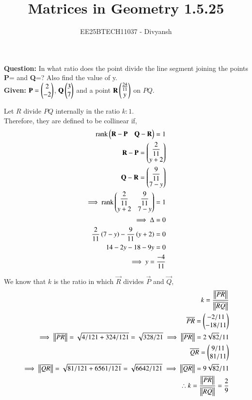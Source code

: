 \documentclass[journal,12pt,onecolumn]{IEEEtran}
\title{Matrices in Geometry 1.5.25}
\author{EE25BTECH11037 - Divyansh}
\theoremstyle{remark}
\begin{document}
\vspace{3cm}
\maketitle
{\let\newpage\relax\maketitle}
\textbf{Question: }
In what ratio does the point  divide the line segment joining the points \textbf{P}= and \textbf{Q}=? Also find the value of y.\\

\textbf{Given: } 
$\mathbf{P}=\begin{pmatrix}2\\-2\end{pmatrix}$, $\mathbf{Q}\begin{pmatrix}3\\7\end{pmatrix}$ and a point $\mathbf{R} \begin{pmatrix}\frac{24}{11} \\ y\end{pmatrix}$ on $PQ$.

Let $R$ divide $PQ$ internally in the ratio $k:1$.\\
Therefore, they are defined to be collinear if,
\begin{align*}
    \text{rank}\begin{pmatrix}\mathbf{R}- \mathbf{P} & \mathbf{Q}-\mathbf{R}\end{pmatrix}=1\\
    \mathbf{R}-\mathbf{P}=\begin{pmatrix}\dfrac{2}{11} \\ y+2\end{pmatrix}\\
    \mathbf{Q}-\mathbf{R}=\begin{pmatrix}\dfrac{9}{11} \\ 7-y\end{pmatrix}\\
    \implies \text{rank}\begin{pmatrix}\dfrac{2}{11} & \dfrac{9}{11} \\ y+2 & 7-y\end{pmatrix} = 1\\
    \implies \Delta=0\\
    \dfrac{2}{11}\left(7-y\right) - \dfrac{9}{11}\left(y+2\right)=0\\
    14-2y-18-9y=0\\
    \implies y=\dfrac{-4}{11}
\end{align*}

We know that $k$ is the ratio in which $\vec{R}$ divides $\vec{P}$ and $\vec{Q}$,
\begin{align*}
    k=\dfrac{\left\lVert\overline{PR}\right\rVert}{\left\lVert\overline{RQ}\right\rVert}\\
    \overline{PR}=\begin{pmatrix}-2/11 \\ -18/11\end{pmatrix} \\ \implies \left\lVert\overline{PR}\right\rVert=\sqrt{4/121 + 324/121}=\sqrt{328/21}
    \implies \left\lVert\overline{PR}\right\rVert=2\sqrt{82}/11 \\
    \overline{QR}=\begin{pmatrix}9/11 \\ 81/11\end{pmatrix} \\ 
    \implies \left\lVert\overline{QR}\right\rVert=\sqrt{81/121 + 6561/121}=\sqrt{6642/121}
    \implies \left\lVert\overline{QR}\right\rVert=9\sqrt{82}/11\\
    \therefore k=\dfrac{\left\lVert\overline{PR}\right\rVert}{\left\lVert\overline{RQ}\right\rVert}=\dfrac{2}{9}
\end{align*}
\end{document}
